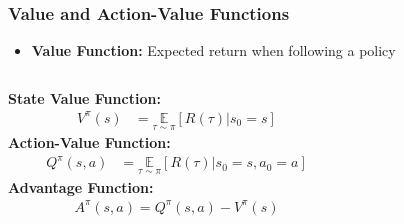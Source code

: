 \begin{frame}
    \frametitle{Value and Action-Value Functions}
    \begin{itemize}
        \item \textbf{Value Function:} Expected return when following a policy
    \end{itemize}
    \vspace{5pt}
    \setlength{\itemsep}{6pt}
    \begin{columns}[T]
        \begin{column}{0.55\textwidth}
            \textbf{State Value Function:}
            \begin{align*}
                V^{\pi}(s) &= \underset{\tau \sim \pi}{\mathbb{E}}\left[R(\tau)|s_0 = s\right]
            \end{align*}
            \vspace{0.3cm}
            \textbf{Action-Value Function:}
            \begin{align*}
                Q^{\pi}(s,a) &= \underset{\tau \sim \pi}{\mathbb{E}}\left[R(\tau)|s_0 = s, a_0 = a\right]
            \end{align*}
            \vspace{0.3cm}
            \textbf{Advantage Function:}
            \begin{align*}
                A^{\pi}(s,a) = Q^{\pi}(s,a) - V^{\pi}(s)
            \end{align*}
        \end{column}
        
        \begin{column}{0.35\textwidth}
            \vspace{-24pt}
            \begin{figure}
                \centering
\end{figure}
\end{column}
\end{columns}
\end{frame}
